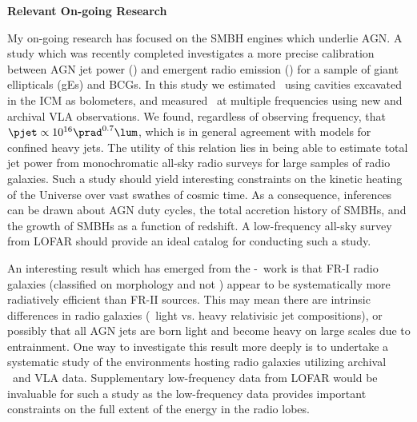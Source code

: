 \documentclass[11pt]{article}
\begin{document}
{\bf{Relevant On-going Research}}


My on-going research has focused on the SMBH engines which underlie
AGN. A study which was recently completed \cite{pjet} investigates a
more precise calibration between AGN jet power (\pjet) and emergent
radio emission (\prad) for a sample of giant ellipticals (gEs) and
BCGs. In this study we estimated \pjet\ using cavities excavated in
the ICM as bolometers, and measured \prad\ at multiple frequencies
using new and archival VLA observations. We found, regardless of
observing frequency, that $\pjet \propto 10^{16} \prad^{0.7} \lum$,
which is in general agreement with models for confined heavy jets. The
utility of this relation lies in being able to estimate total jet
power from monochromatic all-sky radio surveys for large samples of
radio galaxies. Such a study should yield interesting constraints on
the kinetic heating of the Universe over vast swathes of cosmic
time. As a consequence, inferences can be drawn about AGN duty cycles,
the total accretion history of SMBHs, and the growth of SMBHs as a
function of redshift. A low-frequency all-sky survey from LOFAR should
provide an ideal catalog for conducting such a study.

An interesting result which has emerged from the \pjet-\prad\ work is
that FR-I radio galaxies (classified on morphology and not \prad)
appear to be systematically more radiatively efficient than FR-II
sources. This may mean there are intrinsic differences in radio
galaxies (\ie\ light vs. heavy relativisic jet compositions), or
possibly that all AGN jets are born light and become heavy on large
scales due to entrainment. One way to investigate this result more
deeply is to undertake a systematic study of the environments hosting
radio galaxies utilizing archival \chandra\ and VLA
data. Supplementary low-frequency data from LOFAR would be invaluable
for such a study as the low-frequency data provides important
constraints on the full extent of the energy in the radio lobes.
\end{document}

